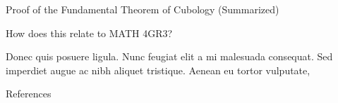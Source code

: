 \documentclass[final]{beamer}
\newlength{\sepwidth}
\newlength{\colwidth}
\newcommand{\separatorcolumn}{\begin{column}{\sepwidth}\end{column}}
\begin{document}
\begin{frame}[t]
\begin{columns}[t]
\begin{column}{\colwidth}
\begin{block}{Proof of the Fundamental Theorem of Cubology (Summarized)}
  \end{block}

  \begin{alertblock}{How does this relate to MATH 4GR3?}



    Donec quis posuere ligula. Nunc feugiat elit a mi malesuada consequat. Sed
    imperdiet augue ac nibh aliquet tristique. Aenean eu tortor vulputate,

  \end{alertblock}

  \begin{block}{References}

    \nocite{*}
    \footnotesize{}

  \end{block}

\end{column}

\separatorcolumn
\end{columns}
\end{frame}
\end{document}
